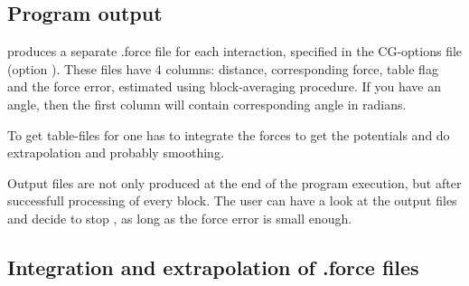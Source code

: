 \subsection{Program output}
\csgfmatch produces a separate .force file for each interaction, specified in the CG-options file (option \textbf{} ).
These files have 4 columns: distance, corresponding force, table flag and the force error, estimated using block-averaging procedure.
If you have an angle, then the first column will contain corresponding angle in radians.

To get table-files for \gromacs one has to integrate the forces to get the potentials and do extrapolation and probably smoothing.

Output files are not only produced at the end of the program execution, but after successfull processing of every block. The user can have a look at the output files and decide to stop \csgfmatch, as long as the force error is small enough.

\subsection{Integration and extrapolation of .force files }

